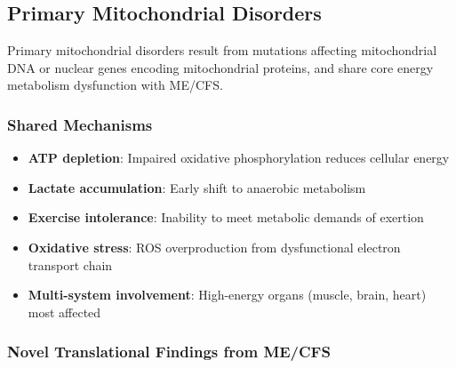 \subsection{Primary Mitochondrial Disorders}
\label{sec:mitochondrial-disorders}

Primary mitochondrial disorders result from mutations affecting mitochondrial DNA or nuclear genes encoding mitochondrial proteins, and share core energy metabolism dysfunction with ME/CFS.

\subsubsection{Shared Mechanisms}

\begin{itemize}
    \item \textbf{ATP depletion}: Impaired oxidative phosphorylation reduces cellular energy
    \item \textbf{Lactate accumulation}: Early shift to anaerobic metabolism
    \item \textbf{Exercise intolerance}: Inability to meet metabolic demands of exertion
    \item \textbf{Oxidative stress}: ROS overproduction from dysfunctional electron transport chain
    \item \textbf{Multi-system involvement}: High-energy organs (muscle, brain, heart) most affected
\end{itemize}

\subsubsection{Novel Translational Findings from ME/CFS}

